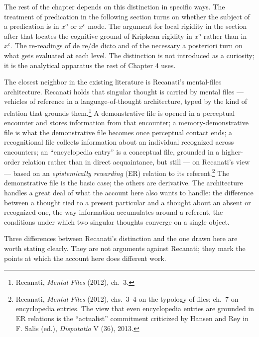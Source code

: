 \documentclass[12pt,a4paper]{article}
\begin{document}
The rest of the chapter depends on this distinction in specific ways. The treatment of predication in the following section turns on whether the subject of a predication is in \(x^o\) or \(x^c\) mode. The argument for local rigidity in the section after that locates the cognitive ground of Kripkean rigidity in \(x^o\) rather than in \(x^c\). The re-readings of de re/de dicto and of the necessary a posteriori turn on what gets evaluated at each level. The distinction is not introduced as a curiosity; it is the analytical apparatus the rest of Chapter 4 uses.

The closest neighbor in the existing literature is Recanati's mental-files architecture. Recanati holds that singular thought is carried by mental files --- vehicles of reference in a language-of-thought architecture, typed by the kind of relation that grounds them.\footnote{Recanati, \emph{Mental Files} (2012), ch.~3.} A demonstrative file is opened in a perceptual encounter and stores information from that encounter; a memory-demonstrative file is what the demonstrative file becomes once perceptual contact ends; a recognitional file collects information about an individual recognized across encounters; an ``encyclopedia entry'' is a conceptual file, grounded in a higher-order relation rather than in direct acquaintance, but still --- on Recanati's view --- based on an \emph{epistemically rewarding} (ER) relation to its referent.\footnote{Recanati, \emph{Mental Files} (2012), chs.~3--4 on the typology of files; ch.~7 on encyclopedia entries. The view that even encyclopedia entries are grounded in ER relations is the ``actualist'' commitment criticized by Hansen and Rey in F. Salis (ed.), \emph{Disputatio} V (36), 2013.} The demonstrative file is the basic case; the others are derivative. The architecture handles a great deal of what the account here also wants to handle: the difference between a thought tied to a present particular and a thought about an absent or recognized one, the way information accumulates around a referent, the conditions under which two singular thoughts converge on a single object.

Three differences between Recanati's distinction and the one drawn here are worth stating clearly. They are not arguments against Recanati; they mark the points at which the account here does different work.
\end{document}
